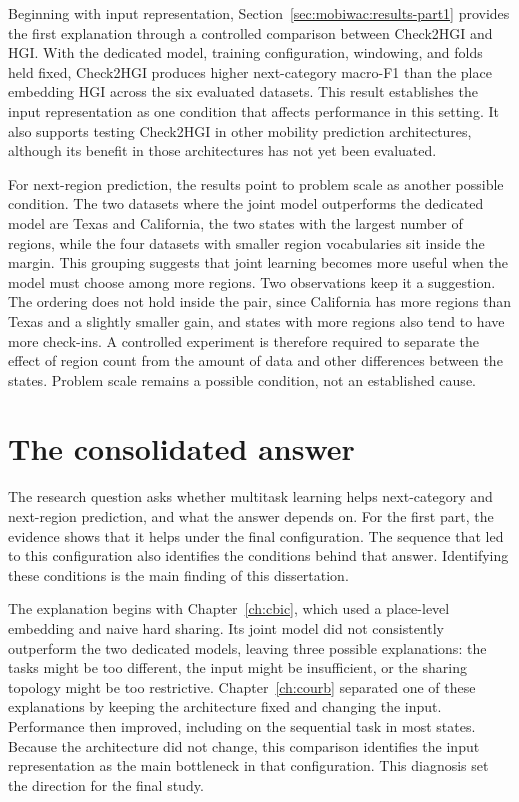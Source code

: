 Beginning with input representation, Section~\ref{sec:mobiwac:results-part1} provides the first
explanation through a controlled comparison between Check2HGI and HGI. With the dedicated
model, training configuration, windowing, and folds held fixed, Check2HGI produces higher
next-category macro-F1 than the place embedding HGI across the six evaluated datasets.
This result establishes the input representation as one condition that affects
performance in this setting. It also supports testing Check2HGI in other mobility
prediction architectures, although its benefit in those architectures has not yet been
evaluated.

For next-region prediction, the results point to problem scale as another possible
condition. The two datasets where the joint model outperforms the dedicated model are
Texas and California, the two states with the largest number of regions, while the four
datasets with smaller region vocabularies sit inside the margin. This grouping suggests
that joint learning becomes more useful when the model must choose among more regions.
Two observations keep it a suggestion. The ordering does not hold inside the pair, since
California has more regions than Texas and a slightly smaller gain, and states with more
regions also tend to have more check-ins. A controlled
experiment is therefore required to separate the effect of region count from the amount
of data and other differences between the states. Problem scale remains a possible
condition, not an established cause.



\section{The consolidated answer}
\label{sec:conc:answer}

The research question asks whether multitask learning helps next-category and
next-region prediction, and what the answer depends on. For the first part, the evidence
shows that it helps under the final configuration. The sequence that led to this
configuration also identifies the conditions behind that answer. Identifying these
conditions is the main finding of this dissertation.

The explanation begins with Chapter~\ref{ch:cbic}, which used a place-level embedding and
naive hard sharing. Its joint model did not consistently outperform the two dedicated
models, leaving three possible explanations: the tasks might be too different, the input
might be insufficient, or the sharing topology might be too restrictive.
Chapter~\ref{ch:courb} separated one of these explanations by
keeping the architecture fixed and changing the input. Performance then improved,
including on the sequential task in most states. Because the architecture did not
change, this comparison identifies the input representation as the main bottleneck in
that configuration. This diagnosis set the direction for the final study.

